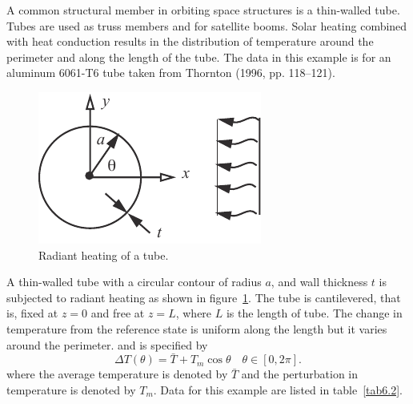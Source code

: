 \documentclass{AeroStructure-ERJohnson}
\begin{document}
\begin{example*}\label{ex6.5}A common structural member in orbiting space structures is a thin-walled tube. Tubes are used as truss members and for satellite booms. Solar heating combined with heat conduction results in the distribution of temperature around the perimeter and along the length of the tube. The data in this example is for an aluminum 6061-T6 tube taken from Thornton (1996, pp. 118--121).

\begin{figure}
\vspace{-19pt}
\includegraphics{Figure_6-9.pdf}
\caption{Radiant heating of a tube. \label{fig6.9}}
\end{figure}

A thin-walled tube with a circular contour of radius $a$, and wall thickness $t$ is subjected to radiant heating as shown in figure~\ref{fig6.9}. The tube is cantilevered, that is, fixed at $z = 0$ and free at $z =L$, where $L$ is the length of tube. The change in temperature from the reference state is uniform along the length but it varies around the perimeter. and is specified by
\begin{equation*}
\Delta T(\theta)=\bar{T}+T_{m} \cos \theta \quad \theta \in[0,2 \pi].\tag{a}
\end{equation*}
where the average temperature is denoted by $\bar{T}$ and the perturbation in temperature is denoted by $T_{m}$. Data for this example are listed in table~\ref{tab6.2}.

\begin{table}[!h]%
\vspace*{-1pc}
\end{table}


\end{example*}
\end{document}
